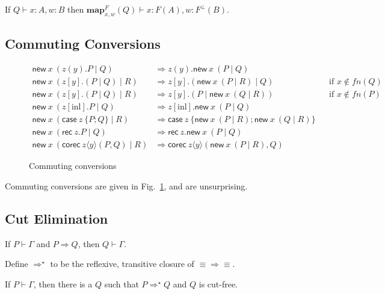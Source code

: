 \documentclass[orivec,envcountsame]{llncs}
\newcommand{\cpdual}[1]{#1^\perp}
\newcommand{\cptyp}[2]{#1 \vdash #2}
\newcommand{\expand}[3]{\mathbf{map}^{#1}_{#2}(#3)}
\newcommand{\mkwd}[1]{\mathsf{#1}}
\newcommand{\cut}[4]{\mkwd{new}\:#1 \: (#3 \mid #4)}
\newcommand{\rec}[1]{\mkwd{rec}\:#1}
\newcommand{\corec}[5]{\mkwd{corec}\:#1 \langle #2 \rangle (#4,#5)}
\newcommand{\clabel}[1]{\mathrm{#1}}
\renewcommand{\case}[2]{\mkwd{case}\:#1\:\{#2\}}
\newcommand{\sel}[2]{#1[\clabel{#2}]}
\begin{document}
\begin{lemma}
  If $\cptyp{Q}{x:A,w:B}$ then \(\cptyp{\expand{F}{x,w}{Q}}{x:F(A), w:\cpdual{F}(B)}.\)
\end{lemma}

\subsection{Commuting Conversions}

\begin{figure}\small
\begin{align*}
  \cut{x}{A}{z(y).P}{Q} &\Longrightarrow z(y).\cut{x}{A}{P}{Q} \\
  \cut{x}{A}{z[y].(P \mid Q)}{R} &\Longrightarrow z[y].(\cut{x}{A}{P}{R} \mid Q) &&\text{if $x \not\in fn(Q)$} \\
  \cut{x}{A}{z[y].(P \mid Q)}{R} &\Longrightarrow z[y].(P \mid \cut{x}{A}{Q}{R}) &&\text{if $x \not\in fn(P)$} \\
  \cut{x}{A}{\sel{z}{inl}.P}{Q} &\Longrightarrow \sel{z}{inl}.\cut{x}{A}{P}{Q} \\
  \cut{x}{A}{\case{z}{P;Q}}{R} &\Longrightarrow \case{z}{\cut{x}{A}{P}{R}; \cut{x}{A}{Q}{R}} \\
  \cut{x}{A}{\rec{z}.P}{Q} &\Longrightarrow \rec{z}.\cut{x}{A}{P}{Q} \\
  \cut{x}{A}{\corec{z}{y}{B}{P}{Q}}{R} &\Longrightarrow \corec{z}{y}{B}{\cut{x}{A}{P}{R}}{Q}
\end{align*}
\caption{Commuting conversions}\label{fig:commuting}
\end{figure}

Commuting conversions are given in Fig.~\ref{fig:commuting}, and are unsurprising.

\subsection{Cut Elimination}

\begin{theorem}
  If $\cptyp{P}{\Gamma}$ and $P \Longrightarrow Q$, then $\cptyp{Q}{\Gamma}.$
\end{theorem}

Define $\Longrightarrow^\star$ to be the reflexive, transitive closure of $\equiv\Longrightarrow\equiv$.

\begin{theorem}
  If $\cptyp{P}{\Gamma}$, then there is a $Q$ such that $P \Longrightarrow^\star Q$ and $Q$ is cut-free.
\end{theorem}
\end{document}
